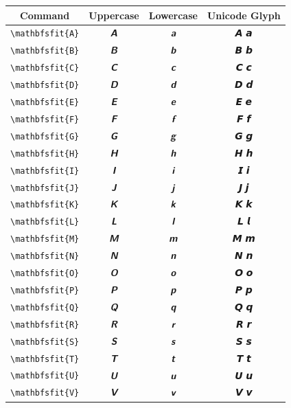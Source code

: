 \documentclass[12pt,a4paper]{article}
\begin{document}
\begin{longtable}{|c|c|c|c|}
\hline
\textbf{Command} & \textbf{Uppercase} & \textbf{Lowercase} & \textbf{Unicode Glyph} \\
\hline
\verb|\mathbfsfit{A}| & $\mathbfsfit{A}$ & $\mathbfsfit{a}$ & 𝘼 𝙖 \\
\verb|\mathbfsfit{B}| & $\mathbfsfit{B}$ & $\mathbfsfit{b}$ & 𝘽 𝙗 \\
\verb|\mathbfsfit{C}| & $\mathbfsfit{C}$ & $\mathbfsfit{c}$ & 𝘾 𝙘 \\
\verb|\mathbfsfit{D}| & $\mathbfsfit{D}$ & $\mathbfsfit{d}$ & 𝘿 𝙙 \\
\verb|\mathbfsfit{E}| & $\mathbfsfit{E}$ & $\mathbfsfit{e}$ & 𝙀 𝙚 \\
\verb|\mathbfsfit{F}| & $\mathbfsfit{F}$ & $\mathbfsfit{f}$ & 𝙁 𝙛 \\
\verb|\mathbfsfit{G}| & $\mathbfsfit{G}$ & $\mathbfsfit{g}$ & 𝙂 𝙜 \\
\verb|\mathbfsfit{H}| & $\mathbfsfit{H}$ & $\mathbfsfit{h}$ & 𝙃 𝙝 \\
\verb|\mathbfsfit{I}| & $\mathbfsfit{I}$ & $\mathbfsfit{i}$ & 𝙄 𝙞 \\
\verb|\mathbfsfit{J}| & $\mathbfsfit{J}$ & $\mathbfsfit{j}$ & 𝙅 𝙟 \\
\verb|\mathbfsfit{K}| & $\mathbfsfit{K}$ & $\mathbfsfit{k}$ & 𝙆 𝙠 \\
\verb|\mathbfsfit{L}| & $\mathbfsfit{L}$ & $\mathbfsfit{l}$ & 𝙇 𝙡 \\
\verb|\mathbfsfit{M}| & $\mathbfsfit{M}$ & $\mathbfsfit{m}$ & 𝙈 𝙢 \\
\verb|\mathbfsfit{N}| & $\mathbfsfit{N}$ & $\mathbfsfit{n}$ & 𝙉 𝙣 \\
\verb|\mathbfsfit{O}| & $\mathbfsfit{O}$ & $\mathbfsfit{o}$ & 𝙊 𝙤 \\
\verb|\mathbfsfit{P}| & $\mathbfsfit{P}$ & $\mathbfsfit{p}$ & 𝙋 𝙥 \\
\verb|\mathbfsfit{Q}| & $\mathbfsfit{Q}$ & $\mathbfsfit{q}$ & 𝙌 𝙦 \\
\verb|\mathbfsfit{R}| & $\mathbfsfit{R}$ & $\mathbfsfit{r}$ & 𝙍 𝙧 \\
\verb|\mathbfsfit{S}| & $\mathbfsfit{S}$ & $\mathbfsfit{s}$ & 𝙎 𝙨 \\
\verb|\mathbfsfit{T}| & $\mathbfsfit{T}$ & $\mathbfsfit{t}$ & 𝙏 𝙩 \\
\verb|\mathbfsfit{U}| & $\mathbfsfit{U}$ & $\mathbfsfit{u}$ & 𝙐 𝙪 \\
\verb|\mathbfsfit{V}| & $\mathbfsfit{V}$ & $\mathbfsfit{v}$ & 𝙑 𝙫 \\

\end{longtable}
\end{document}
